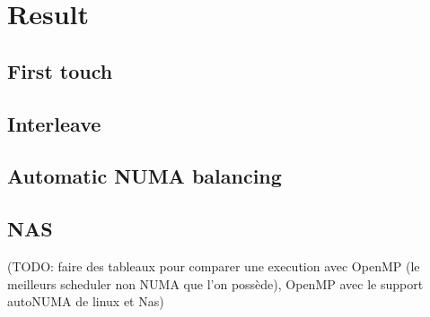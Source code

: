 \section{Result}




\subsection{First touch}
\subsection{Interleave}
\subsection{Automatic NUMA balancing}
\subsection{NAS}

(TODO: faire des tableaux pour comparer une execution avec OpenMP (le meilleurs scheduler non NUMA que l'on possède), OpenMP avec le support autoNUMA de linux et Nas)
